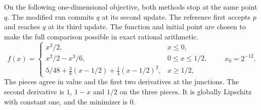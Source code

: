 \documentclass[11pt]{article}
\begin{document}
On the following one-dimensional objective, both methods stop at the
same point \(q\). The modified run commits \(q\) at its second update.
The reference first accepts \(p\) and reaches \(q\) at its third update.
The function and initial point are chosen to make the full comparison
possible in exact rational arithmetic.
\[
 f(x)=
 \begin{cases}
 x^2/2, & x\le0,\\
 x^2/2-x^3/6, & 0\le x\le 1/2,\\
 5/48+\tfrac38(x-1/2)+\tfrac14(x-1/2)^2, & x\ge1/2 ,
 \end{cases}
 \qquad x_0=2^{-12}.
\]
The pieces agree in value and the first two derivatives at the
junctions. The second derivative is \(1\), \(1-x\) and \(1/2\)
on the three pieces. It is globally Lipschitz with constant one,
and the minimizer is \(0\).
\end{document}
